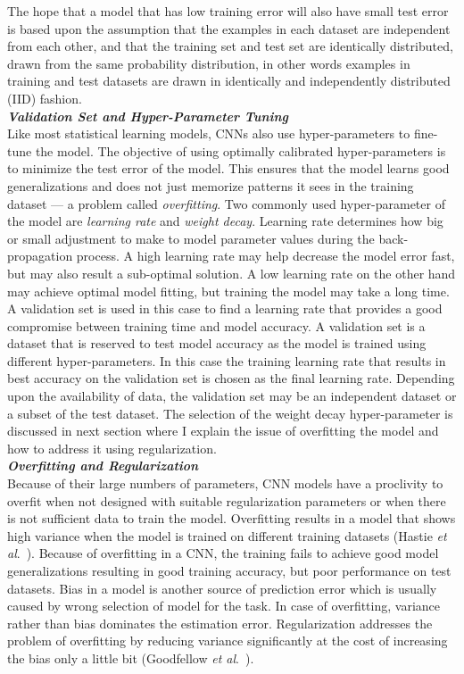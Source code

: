 \documentclass [11pt,letterpaper ,twoside ,openany ]{report}
\begin{document}
    The hope that a model that has low training error will also have small test error is based upon the assumption that the examples in each dataset are independent from each other, and that the training set and test set are identically distributed, drawn from the same probability distribution, in other words examples in training and test datasets are drawn in identically and independently distributed (IID) fashion.\\

    
    \noindent
    \textbf{\textit{Validation Set and Hyper-Parameter Tuning}}\\
    Like most statistical learning models, CNNs also use hyper-parameters to fine-tune the model. The objective of using optimally calibrated hyper-parameters is to minimize the test error of the model. This ensures that the model learns good generalizations and does not just memorize patterns it sees in the training dataset --- a problem called \textit{overfitting}. Two commonly used hyper-parameter of the model are \textit{learning rate} and \textit{weight decay}. Learning rate determines how big or small adjustment to make to model parameter values during the back-propagation process. A high learning rate may help decrease the model error fast, but may also result a sub-optimal solution. A low learning rate on the other hand may achieve optimal model fitting, but training the model may take a long time. A validation set is used in this case to find a learning rate that provides a good compromise between training time and model accuracy. A validation set is a dataset that is reserved to test model accuracy as the model is trained using different hyper-parameters. In this case the training learning rate that results in best accuracy on the validation set is chosen as the final learning rate. Depending upon the availability of data, the validation set may be an independent dataset or a subset of the test dataset. The selection of the weight decay hyper-parameter is discussed in next section where I explain the issue of overfitting the model and how to address it using regularization.\\

    \noindent
    \textbf{\textit{Overfitting and Regularization}}\\    
    Because of their large numbers of parameters, CNN models have a proclivity to overfit when not designed with suitable regularization parameters or when there is not sufficient data to train the model. Overfitting results in a model that shows high variance when the model is trained on different training datasets (Hastie \textit{et al}.\ \cite{hastie-et-al-2014}). Because of overfitting in a CNN, the training fails to achieve good model generalizations resulting in good training accuracy, but poor performance on test datasets. Bias in a model is another source of prediction error which is usually caused by wrong selection of model for the task. In case of overfitting, variance rather than bias dominates the estimation error. Regularization addresses the problem of overfitting by reducing variance significantly at the cost of increasing the bias only a little bit (Goodfellow \textit{et al}.\ \cite{Goodfellow-et-al-2016}). 
\end{document}
